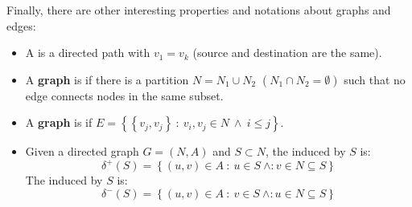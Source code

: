 \highspace
Finally, there are other interesting properties and notations about graphs and edges:
\begin{itemize}
    \item A  is a directed path with $v_{1} = v_{k}$ (source and destination are the same).

    \item A \textbf{graph} is  if there is a partition $N = N_{1} \cup N_{2}$ $\left(N_{1} \cap N_{2} = \emptyset\right)$ such that no edge connects nodes in the same subset.

    \item A \textbf{graph} is  if $E = \left\{\left\{v_{j}, v_{j}\right\} \: : \: v_{i}, v_{j} \in N \: \land \: i \le j\right\}$.

    \item Given a directed graph $G = \left(N,A\right)$ and $S \subset N$, the  induced by $S$ is:
    \begin{equation*}
        \delta^{+}\left(S\right) = \left\{\left(u,v\right) \in A \: : \: u \in S \: \land : v \in N \subseteq S\right\}
    \end{equation*}
    The  induced by $S$ is:
    \begin{equation*}
        \delta^{-}\left(S\right) = \left\{\left(u,v\right) \in A \: : \: v \in S \: \land : u \in N \subseteq S\right\}
    \end{equation*}
\end{itemize}

\newpage

